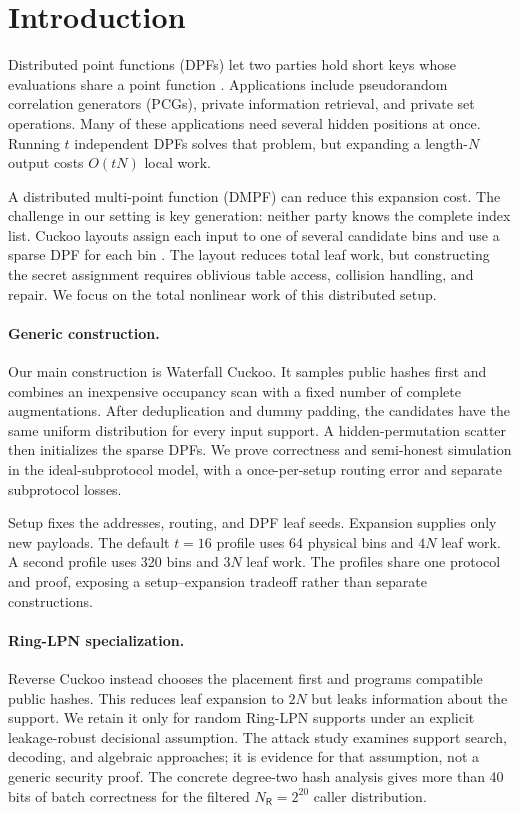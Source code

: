 \section{Introduction}

Distributed point functions (DPFs) let two parties hold short keys whose
evaluations share a point function \cite{dpf,dpf2,fss}.
Applications include pseudorandom correlation generators (PCGs), private
information retrieval, and private set operations.
Many of these applications need several hidden positions at once.
Running $t$ independent DPFs solves that problem, but expanding a
length-$N$ output costs $O(tN)$ local work.

A distributed multi-point function (DMPF) can reduce this expansion cost.
The challenge in our setting is key generation: neither party knows the
complete index list.
Cuckoo layouts assign each input to one of several candidate bins and use a
sparse DPF for each bin \cite{fssBatchCodes,cuckooDmpf,dmpf}.
The layout reduces total leaf work, but constructing the secret assignment
requires oblivious table access, collision handling, and repair.
We focus on the total nonlinear work of this distributed setup.

\paragraph{Generic construction.}
Our main construction is Waterfall Cuckoo.
It samples public hashes first and combines an inexpensive occupancy scan
with a fixed number of complete augmentations.
After deduplication and dummy padding, the candidates have the same uniform
distribution for every input support.
A hidden-permutation scatter then initializes the sparse DPFs.
We prove correctness and semi-honest simulation in the ideal-subprotocol
model, with a once-per-setup routing error and separate subprotocol losses.

Setup fixes the addresses, routing, and DPF leaf seeds.
Expansion supplies only new payloads.
The default $t=16$ profile uses 64 physical bins and $4N$ leaf work.
A second profile uses 320 bins and $3N$ leaf work.
The profiles share one protocol and proof, exposing a setup--expansion
tradeoff rather than separate constructions.

\paragraph{Ring-LPN specialization.}
Reverse Cuckoo instead chooses the placement first and programs compatible
public hashes. This reduces leaf expansion to $2N$ but leaks information
about the support.
We retain it only for random Ring-LPN supports under an explicit
leakage-robust decisional assumption.
The attack study examines support search, decoding, and algebraic approaches;
it is evidence for that assumption, not a generic security proof.
The concrete degree-two hash analysis gives more than 40 bits of batch
correctness for the filtered $N_{\mathsf R}=2^{20}$ caller distribution.

